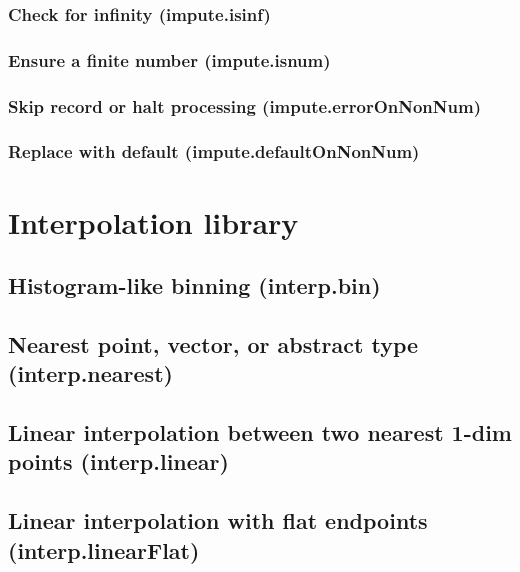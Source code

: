 \documentclass{article}
\theoremstyle{definition}
\begin{document}
\subsubsection{Check for infinity (impute.isinf)}

\subsubsection{Ensure a finite number (impute.isnum)}

\subsubsection{Skip record or halt processing (impute.errorOnNonNum)}

\subsubsection{Replace with default (impute.defaultOnNonNum)}

\pagebreak

\section{Interpolation library}

\subsection{Histogram-like binning (interp.bin)}

\subsection{Nearest point, vector, or abstract type (interp.nearest)}

\subsection{Linear interpolation between two nearest 1-dim points (interp.linear)}

\subsection{Linear interpolation with flat endpoints (interp.linearFlat)}
\end{document}
